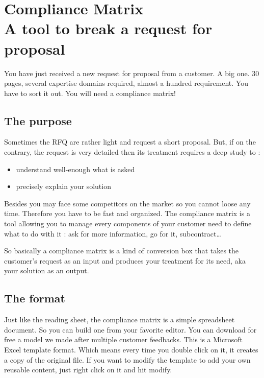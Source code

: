 \setchapterpreamble[u]{\margintoc}
\chapter{Compliance Matrix\\A tool to break a request for proposal}
\label{sec:ComplianceMatrrix}

You have just received a new request for proposal from a customer. A big one. 30 pages, several expertise domains required, almost a hundred requirement. You have to sort it out. You will need a compliance matrix!

\section{The purpose}
Sometimes the RFQ are rather light and request a short proposal. But, if on the contrary, the request is very detailed then its treatment requires a deep study to :

\begin{itemize}
    \item understand well-enough what is asked
    \item precisely explain your solution
\end{itemize}

Besides you may face some competitors on the market so you cannot loose any time. Therefore you have to be fast and organized. The compliance matrix is a tool allowing you to manage every components of your customer need to define what to do with it : ask for more information, go for it, subcontract…

So basically a compliance matrix is a kind of conversion box that takes the customer’s request as an input and produces your treatment for its need, aka your solution as an output.

\section{The format}
Just like the reading sheet, the compliance matrix is a simple spreadsheet document. So you can build one from your favorite editor. You can download for free a model we made after multiple customer feedbacks. This is a Microsoft Excel template format. Which means every time you double click on it, it creates a copy of the original file. If you want to modify the template to add your own reusable content, just right click on it and hit modify.

